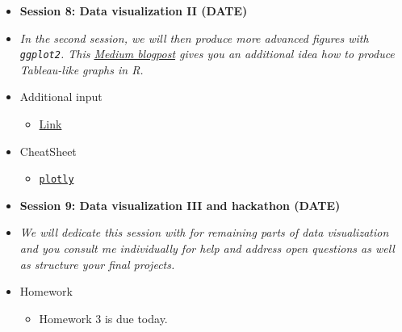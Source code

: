 \documentclass{article}
\begin{document}
\begin{itemize}
\vspace{-0.1cm}
\item[] \textbf{Session 8: Data visualization II (DATE)} 
\item[]\textit{In the second session, we will then produce more advanced figures with \texttt{ggplot2}. This \href{https://towardsdatascience.com/tableau-esque-drag-and-drop-gui-visualization-in-r-901ee9f2fe3f}{Medium blogpost} gives you an additional idea how to produce Tableau-like graphs in \textsf{R}.} 
{\color{darkgray}}
\item[] \faEdit \space Additional input
\begin{itemize} 
\item[$\square$] \href{url}{Link}
\end{itemize}
\item[] \faLightbulbO \space CheatSheet
\begin{itemize} 
\item[$\square$] \href{https://images.plot.ly/plotly-documentation/images/r_cheat_sheet.pdf}{\texttt{plotly}}
\end{itemize}

\vspace{0.5cm}
\item[] \textbf{Session 9: Data visualization III and hackathon (DATE)} 
\item[]\textit{We will dedicate this session with for remaining parts of data visualization and you consult me individually for help and address open questions as well as structure your final projects.}
\item[] \faExclamation \space Homework
\begin{itemize} 
\item[$\square$] Homework 3 is due today.
\end{itemize}


\end{itemize}
\end{document}
